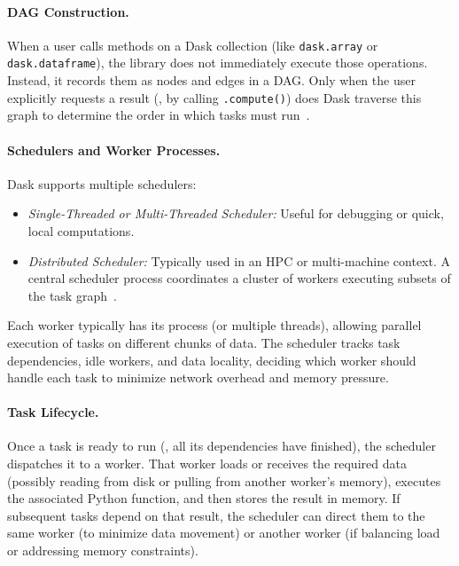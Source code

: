 \paragraph{DAG Construction.}
When a user calls methods on a Dask collection (like \texttt{dask.array} or \texttt{dask.dataframe}), the library does not immediately execute those operations.
Instead, it records them as nodes and edges in a \ac{DAG}.
Only when the user explicitly requests a result (\eg, by calling \texttt{.compute()}) does Dask traverse this graph to determine the order in which tasks must run~\cite{rocklin2015dask}.

\paragraph{Schedulers and Worker Processes.}
Dask supports multiple schedulers:
\begin{itemize}
    \item \emph{Single-Threaded or Multi-Threaded Scheduler:} Useful for debugging or quick, local computations.
    \item \emph{Distributed Scheduler:} Typically used in an \ac{HPC} or multi-machine context. A central scheduler process coordinates a cluster of workers executing subsets of the task graph~\cite{rocklin2015dask}.
\end{itemize}
Each worker typically has its process (or multiple threads), allowing parallel execution of tasks on different chunks of data.
The scheduler tracks task dependencies, idle workers, and data locality, deciding which worker should handle each task to minimize network overhead and memory pressure.

\paragraph{Task Lifecycle.}
Once a task is ready to run (\ie, all its dependencies have finished), the scheduler dispatches it to a worker.
That worker loads or receives the required data (possibly reading from disk or pulling from another worker's memory), executes the associated Python function, and then stores the result in memory.
If subsequent tasks depend on that result, the scheduler can direct them to the same worker (to minimize data movement) or another worker (if balancing load or addressing memory constraints).

